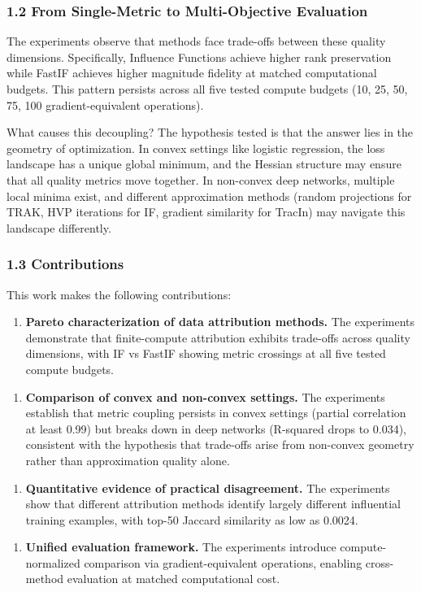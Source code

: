 \subsubsection{1.2 From Single-Metric to Multi-Objective Evaluation}

The experiments observe that methods face trade-offs between these quality dimensions. Specifically, Influence Functions achieve higher rank preservation while FastIF achieves higher magnitude fidelity at matched computational budgets. This pattern persists across all five tested compute budgets (10, 25, 50, 75, 100 gradient-equivalent operations).

What causes this decoupling? The hypothesis tested is that the answer lies in the geometry of optimization. In convex settings like logistic regression, the loss landscape has a unique global minimum, and the Hessian structure may ensure that all quality metrics move together. In non-convex deep networks, multiple local minima exist, and different approximation methods (random projections for TRAK, HVP iterations for IF, gradient similarity for TracIn) may navigate this landscape differently.

\subsubsection{1.3 Contributions}

This work makes the following contributions:

\begin{enumerate}
\item \textbf{Pareto characterization of data attribution methods.} The experiments demonstrate that finite-compute attribution exhibits trade-offs across quality dimensions, with IF vs FastIF showing metric crossings at all five tested compute budgets.
\end{enumerate}

\begin{enumerate}
\item \textbf{Comparison of convex and non-convex settings.} The experiments establish that metric coupling persists in convex settings (partial correlation at least 0.99) but breaks down in deep networks (R-squared drops to 0.034), consistent with the hypothesis that trade-offs arise from non-convex geometry rather than approximation quality alone.
\end{enumerate}

\begin{enumerate}
\item \textbf{Quantitative evidence of practical disagreement.} The experiments show that different attribution methods identify largely different influential training examples, with top-50 Jaccard similarity as low as 0.0024.
\end{enumerate}

\begin{enumerate}
\item \textbf{Unified evaluation framework.} The experiments introduce compute-normalized comparison via gradient-equivalent operations, enabling cross-method evaluation at matched computational cost.
\end{enumerate}
